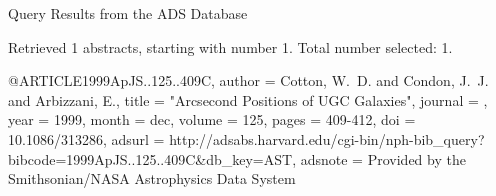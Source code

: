 Query Results from the ADS Database


Retrieved 1 abstracts, starting with number 1.  Total number selected: 1.

@ARTICLE{1999ApJS..125..409C,
   author = {{Cotton}, W.~D. and {Condon}, J.~J. and {Arbizzani}, E.},
    title = "{Arcsecond Positions of UGC Galaxies}",
  journal = {\apjs},
     year = 1999,
    month = dec,
   volume = 125,
    pages = {409-412},
      doi = {10.1086/313286},
   adsurl = {http://adsabs.harvard.edu/cgi-bin/nph-bib_query?bibcode=1999ApJS..125..409C&db_key=AST},
  adsnote = {Provided by the Smithsonian/NASA Astrophysics Data System}
}


